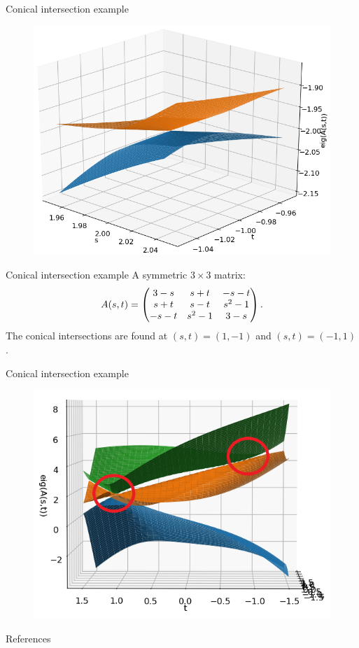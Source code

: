 \documentclass{beamer}
\begin{document}
\begin{frame}{Conical intersection example}
    \begin{figure}[h]
        \centering
        \includegraphics[scale=0.5]{img/slide/conint_3sheet_angle8.png}
        \label{fig:conint}
    \end{figure}
\end{frame}
\fi %
\begin{frame}{Conical intersection example}
    A symmetric $3 \times 3$ matrix:
    \begin{equation}
        A(s,t)=
        \begin{pmatrix}
            3-s & s+t & -s-t \cr s+t & s-t & s^2-1 \cr -s-t & s^2-1 & 3-s
        \end{pmatrix}
        .
    \end{equation}
    The conical intersections are found at $(s,t)=(1,-1)$ and $(s,t) = (-1, 1)$.
\end{frame}
\begin{frame}{Conical intersection example}
    \begin{figure}[h]
        \centering
        \includegraphics[scale=0.5]{img/slide/conint_3sheet_angle10.png}
        \label{fig:conint}
    \end{figure}
    \nocite{*} %
\end{frame}

\begin{frame}[shrink=50]{References}
    \tiny
    \printbibliography
\end{frame}
\end{document}

